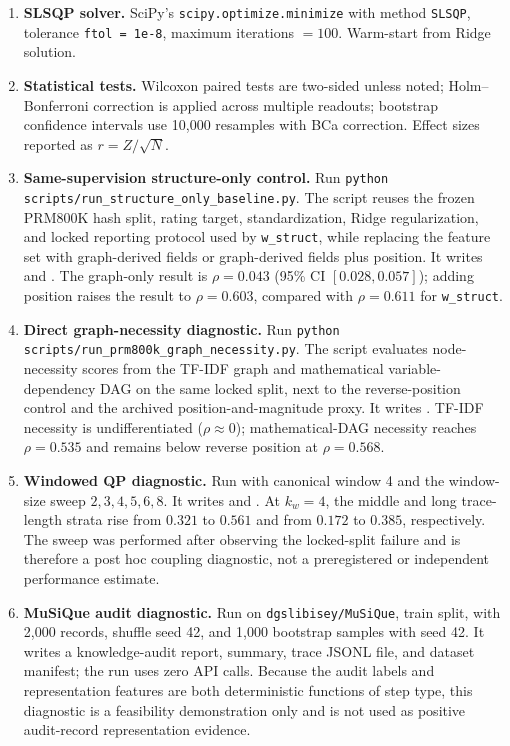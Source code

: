 \documentclass[pdflatex,sn-mathphys-num]{sn-jnl}
\begin{document}
\begin{enumerate}
\item \textbf{SLSQP solver.} SciPy's \texttt{scipy.optimize.minimize} with method \texttt{SLSQP}, tolerance \texttt{ftol = 1e-8}, maximum iterations $= 100$. Warm-start from Ridge solution.
\item \textbf{Statistical tests.} Wilcoxon paired tests are two-sided unless noted; Holm--Bonferroni correction is applied across multiple readouts; bootstrap confidence intervals use 10{,}000 resamples with BCa correction. Effect sizes reported as $r = Z/\sqrt{N}$.
\item \textbf{Same-supervision structure-only control.} Run \texttt{python scripts/run\_structure\_only\_baseline.py}. The script reuses the frozen PRM800K hash split, rating target, standardization, Ridge regularization, and locked reporting protocol used by \texttt{w\_struct}, while replacing the feature set with graph-derived fields or graph-derived fields plus position. It writes  and . The graph-only result is $\rho=0.043$ (95\% CI $[0.028,0.057]$); adding position raises the result to $\rho=0.603$, compared with $\rho=0.611$ for \texttt{w\_struct}.
\item \textbf{Direct graph-necessity diagnostic.} Run \texttt{python scripts/run\_prm800k\_graph\_necessity.py}. The script evaluates node-necessity scores from the TF-IDF graph and mathematical variable-dependency DAG on the same locked split, next to the reverse-position control and the archived position-and-magnitude proxy. It writes . TF-IDF necessity is undifferentiated ($\rho\approx0$); mathematical-DAG necessity reaches $\rho=0.535$ and remains below reverse position at $\rho=0.568$.
\item \textbf{Windowed QP diagnostic.} Run  with canonical window 4 and the window-size sweep $2,3,4,5,6,8$. It writes  and . At $k_w=4$, the middle and long trace-length strata rise from $0.321$ to $0.561$ and from $0.172$ to $0.385$, respectively. The sweep was performed after observing the locked-split failure and is therefore a post hoc coupling diagnostic, not a preregistered or independent performance estimate.
\item \textbf{MuSiQue audit diagnostic.} Run  on \texttt{dgslibisey/MuSiQue}, train split, with 2,000 records, shuffle seed 42, and 1,000 bootstrap samples with seed 42. It writes a knowledge-audit report, summary, trace JSONL file, and dataset manifest; the run uses zero API calls. Because the audit labels and representation features are both deterministic functions of step type, this diagnostic is a feasibility demonstration only and is not used as positive audit-record representation evidence.

\end{enumerate}
\end{document}
